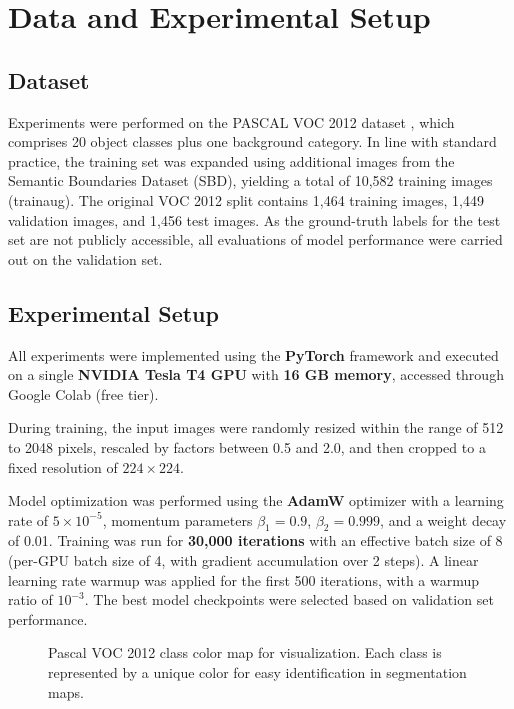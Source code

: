 \section{Data and Experimental Setup}
\label{sec:data_and_experimental_setup}

\subsection{Dataset}
\label{subsec:dataset}
Experiments were performed on the PASCAL VOC 2012 dataset \cite{dataset_pascal_voc}, which comprises 20 object classes plus one background category. In line with standard practice, the training set was expanded using additional images from the Semantic Boundaries Dataset (SBD), yielding a total of 10,582 training images (trainaug). The original VOC 2012 split contains 1,464 training images, 1,449 validation images, and 1,456 test images. As the ground-truth labels for the test set are not publicly accessible, all evaluations of model performance were carried out on the validation set.

\subsection{Experimental Setup}
\label{subsec:experimental_setup}
All experiments were implemented using the \textbf{PyTorch} framework and executed on a single \textbf{NVIDIA Tesla T4 GPU} with \textbf{16 GB memory}, accessed through Google Colab (free tier).

During training, the input images were randomly resized within the range of 512 to 2048 pixels, rescaled by factors between 0.5 and 2.0, and then cropped to a fixed resolution of $224 \times 224$.

Model optimization was performed using the \textbf{AdamW} optimizer with a learning rate of $5 \times 10^{-5}$, momentum parameters $\beta_1 = 0.9$, $\beta_2 = 0.999$, and a weight decay of 0.01. Training was run for \textbf{30,000 iterations} with an effective batch size of 8 (per-GPU batch size of 4, with gradient accumulation over 2 steps). A linear learning rate warmup was applied for the first 500 iterations, with a warmup ratio of $10^{-3}$. The best model checkpoints were selected based on validation set performance.

\begin{figure}[t]
    \centering
    \caption{Pascal VOC 2012 class color map for visualization. Each class is represented by a unique color for easy identification in segmentation maps.}
    \label{fig:class_colors_voc2012}
\end{figure}

